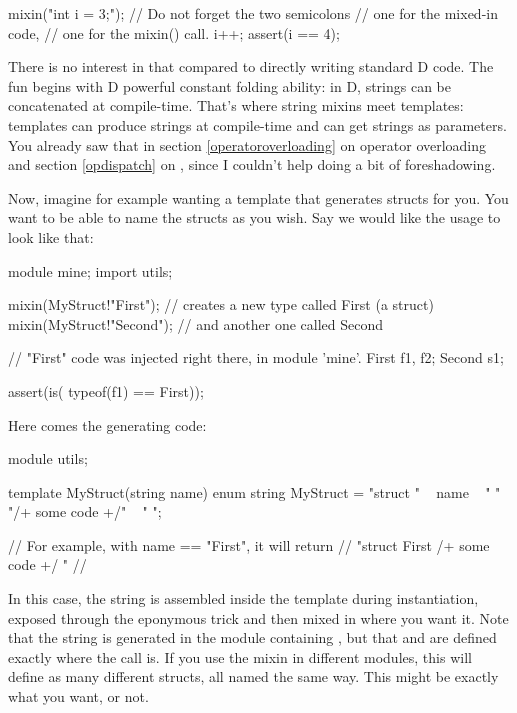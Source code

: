 \begin{dcode}
mixin("int i = 3;"); // Do not forget the two semicolons
                     // one for the mixed-in code,
                     // one for the mixin() call.
i++;
assert(i == 4);
\end{dcode}

There is no interest in that compared to directly writing standard D code. The fun begins with D powerful constant folding ability: in D, strings can be concatenated at compile-time. That's where string mixins meet templates: templates can produce strings at compile-time and can get strings as parameters. You already saw that in section \ref{operatoroverloading} on operator overloading and section \ref{opdispatch} on , since I couldn't help doing a bit of foreshadowing.

Now, imagine for example wanting a template that generates structs for you. You want to be able to name the structs as you wish. Say we would like the usage to look like that:

\begin{dcode}
module mine;
import utils;

mixin(MyStruct!"First");  // creates a new type called First (a struct)
mixin(MyStruct!"Second"); // and another one called Second

// "First" code was injected right there, in module 'mine'.
First f1, f2;
Second s1;

assert(is( typeof(f1) == First)); 
\end{dcode}

Here comes the generating code:

\begin{dcode}
module utils;

template MyStruct(string name)
{
    enum string MyStruct = "struct " ~ name 
                         ~ " { "
                         ~ "/+ some code +/"
                         ~ " }";
}

// For example, with name == "First", it will return
//   "struct First { /+ some code +/ }"
//
\end{dcode}

In this case, the string is assembled inside the template during instantiation,  exposed through the eponymous trick and then mixed in where you want it. Note that the string is generated in the  module containing , but that  and  are defined exactly where the \DD{()} call is. If you use the mixin in different modules, this will define as many different structs, all named the same way. This might be exactly what you want, or not.

